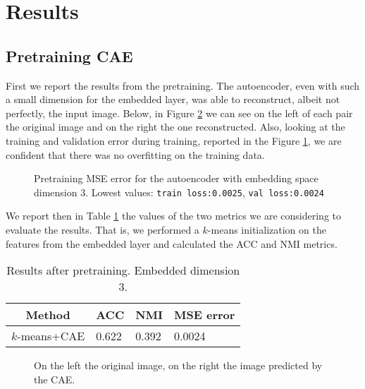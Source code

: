\section{Results}

\subsection{Pretraining CAE}

First we report the results from the pretraining. The autoencoder, even with such a small dimension for the embedded layer, was able to reconstruct, albeit not perfectly, the input image. Below, in Figure \ref{fig:pred_CAE} we can see on the left of each pair the original image and on the right the one reconstructed. Also, looking at the training and validation error during training, reported in the Figure \ref{fig:metrics_pretrain}, we are confident that there was no overfitting on the training data. 

\begin{figure}[H]
    \centering
    
    \caption{Pretraining MSE error for the autoencoder with embedding space dimension 3. Lowest values: \texttt{train loss:0.0025}, \texttt{val loss:0.0024}}
    \label{fig:metrics_pretrain}
\end{figure}

We report then in Table \ref{table:result_pretrain_3} the values of the two metrics we are considering to evaluate the results. That is, we performed a $k$-means initialization on the features from the embedded layer and calculated the ACC and NMI metrics.

\begin{table}[H]
    \centering
    \begin{tabular}{c|lll} \hline
        \textbf{Method}     & \textbf{ACC}          &  \textbf{NMI} &  \textbf{MSE error}      \\ \hline
        $k$-means+CAE  & 0.622      & 0.392    & 0.0024   \\ \hline
    \end{tabular}
    \caption{Results after pretraining. Embedded dimension 3.}
    \label{table:result_pretrain_3}
\end{table}

\begin{figure}[H]
    \centering
    
    
    
    \caption{On the left the original image, on the right the image predicted by the CAE.}
    \label{fig:pred_CAE}
\end{figure}

